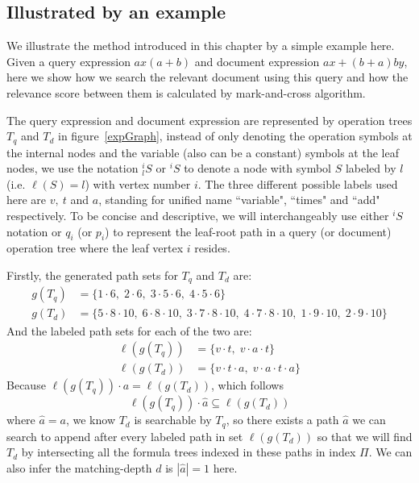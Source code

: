 \subsection{Illustrated by an example}
\label{secIllu}

We illustrate the method introduced in this chapter by a simple example here. 
Given a query expression $ax(a+b)$ and document expression $ax + (b+a)by$, here we show how we search the relevant document using this query and how the relevance score between them is calculated by mark-and-cross algorithm.

The query expression and document expression are represented by operation trees $T_q$ and $T_d$ in figure~\ref{expGraph}, 
instead of only denoting the operation symbols at the internal nodes and the variable (also can be a constant) symbols at the leaf nodes, we use the notation $^i_l S$ or $^i S$ to denote a node with symbol $S$ labeled by $l$ (i.e. $\ell(S)=l$) with vertex number $i$. 
The three different possible labels used here are $v,\ t$ and $a$, standing for unified name ``variable", ``times" and ``add" respectively.
To be concise and descriptive, we will interchangeably use either $^i S$ notation or $q_i$ (or $p_i$) to represent the leaf-root path in a query (or document) operation tree where the leaf vertex $i$ resides.

Firstly, the generated path sets for $T_q$ and $T_d$ are:
$$
\begin{aligned}
g(T_q) &= \{ 1\cdot6,\; 2\cdot6,\; 3\cdot5\cdot6,\; 4\cdot5\cdot6\} \\
g(T_d) &= \{ 5\cdot8\cdot10,\; 6\cdot8\cdot10,\; 3\cdot7\cdot8\cdot10,\; 4\cdot7\cdot8\cdot10,\; 1\cdot9\cdot10,\; 2\cdot9\cdot10\}
\end{aligned}
$$
And the labeled path sets for each of the two are:
$$
\begin{aligned}
\ell\left(g(T_q)\right) &= \{ v\cdot t,\; v\cdot a\cdot t \} \\
\ell\left(g(T_d)\right) &= \{ v\cdot t\cdot a,\; v\cdot a\cdot t \cdot a \}
\end{aligned}
$$
Because $\ell\left(g(T_q)\right) \cdot a = \ell\left(g(T_d)\right)$, which follows 
$$
\ell(g(T_q)) \cdot \hat{a} \subseteq \ell(g(T_d))
$$
where $\hat{a} = a$, 
we know $T_d$ is searchable by $T_q$, so there exists a path $\hat{a}$ we can search to append after every labeled path in set $\ell\left(g(T_d)\right)$ so that we will find $T_d$ by intersecting all the formula trees indexed in these paths in index $\Pi$.
We can also infer the matching-depth $d$ is $|\hat{a}| = 1$ here. 

